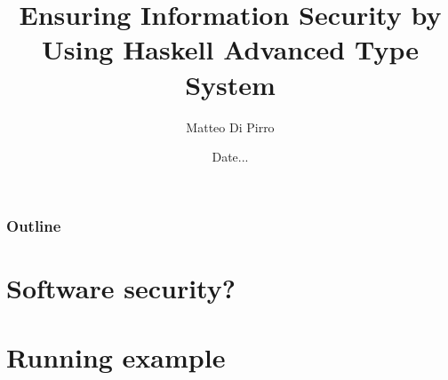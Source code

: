 \documentclass{beamer}
\title{Ensuring Information Security \newline by Using Haskell Advanced Type System}
\subtitle{}
\author{Matteo Di Pirro}
\date{Date...}
\institute{University of Padova}
\begin{document}
\newcommand{\turnOffNumbers}{true} %

\begin{frame}[noframenumbering]
\titlepage
\end{frame}

\let\turnOffNumbers\empty
\begin{frame}
	\frametitle{Outline}
	\tableofcontents
\end{frame}

\section{Software security?}



\section{Running example}


\appendix
\makethanks
\renewcommand{\turnOffNumbers}{true} %
\end{document}
